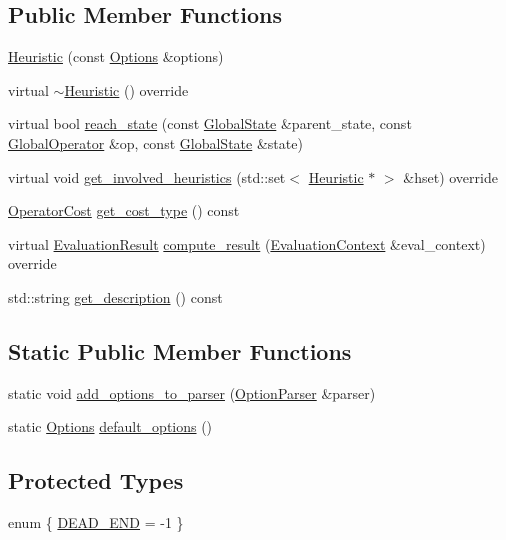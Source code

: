\subsection*{Public Member Functions}
\begin{DoxyCompactItemize}
\item 
\hyperlink{classHeuristic_a45e601b8a88609b69f283a60734c0ff2}{Heuristic} (const \hyperlink{classOptions}{Options} \&options)
\item 
virtual \hyperlink{classHeuristic_a669d7a4061d44f59e896eccafa6b52f8}{$\sim$\-Heuristic} () override
\item 
virtual bool \hyperlink{classHeuristic_a25e046165a9d5ff1f886288b52b3ec2b}{reach\-\_\-state} (const \hyperlink{classGlobalState}{Global\-State} \&parent\-\_\-state, const \hyperlink{classGlobalOperator}{Global\-Operator} \&op, const \hyperlink{classGlobalState}{Global\-State} \&state)
\item 
virtual void \hyperlink{classHeuristic_a0b9a7302390591c08ccc6ff9daede82c}{get\-\_\-involved\-\_\-heuristics} (std\-::set$<$ \hyperlink{classHeuristic}{Heuristic} $\ast$ $>$ \&hset) override
\item 
\hyperlink{operator__cost_8h_aea97a5a2fbe3b57faf505007e38f5de9}{Operator\-Cost} \hyperlink{classHeuristic_ad0928854099390c9e2004928c01a98a8}{get\-\_\-cost\-\_\-type} () const 
\item 
virtual \hyperlink{classEvaluationResult}{Evaluation\-Result} \hyperlink{classHeuristic_a47b52f0c6ccdb8caa8b3e3e292600324}{compute\-\_\-result} (\hyperlink{classEvaluationContext}{Evaluation\-Context} \&eval\-\_\-context) override
\item 
std\-::string \hyperlink{classHeuristic_a537447ab5e02c23e085246f188abf37d}{get\-\_\-description} () const 
\end{DoxyCompactItemize}
\subsection*{Static Public Member Functions}
\begin{DoxyCompactItemize}
\item 
static void \hyperlink{classHeuristic_a1d20e58f0d2bbd0b9135d1b546545b9e}{add\-\_\-options\-\_\-to\-\_\-parser} (\hyperlink{classOptionParser}{Option\-Parser} \&parser)
\item 
static \hyperlink{classOptions}{Options} \hyperlink{classHeuristic_ad7f1131249b7ffabebb167c2c5b21847}{default\-\_\-options} ()
\end{DoxyCompactItemize}
\subsection*{Protected Types}
\begin{DoxyCompactItemize}
\item 
enum \{ \hyperlink{classHeuristic_a252f4938433a2e2b18aaa6ca890eefdea09f529c9936b0e5d7e5a4c9936d1e81a}{D\-E\-A\-D\-\_\-\-E\-N\-D} = -\/1
 \}
\end{DoxyCompactItemize}

